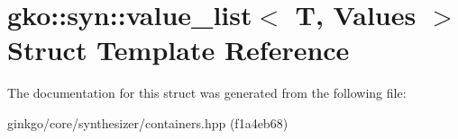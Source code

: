 \hypertarget{structgko_1_1syn_1_1value__list}{}\section{gko\+:\+:syn\+:\+:value\+\_\+list$<$ T, Values $>$ Struct Template Reference}
\label{structgko_1_1syn_1_1value__list}


The documentation for this struct was generated from the following file\+:\begin{DoxyCompactItemize}
\item 
ginkgo/core/synthesizer/containers.\+hpp (f1a4eb68)\end{DoxyCompactItemize}
